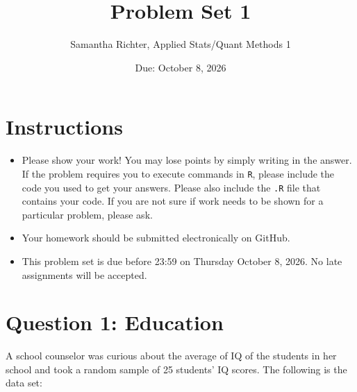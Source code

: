 \documentclass[12pt,letterpaper]{article}
\title{Problem Set 1}
\date{Due: October 8, 2026}
\author{Samantha Richter, Applied Stats/Quant Methods 1}
\begin{document}
	\maketitle
	
	\section*{Instructions}
	\begin{itemize}
	\item Please show your work! You may lose points by simply writing in the answer. If the problem requires you to execute commands in \texttt{R}, please include the code you used to get your answers. Please also include the \texttt{.R} file that contains your code. If you are not sure if work needs to be shown for a particular problem, please ask.
\item Your homework should be submitted electronically on GitHub.
\item This problem set is due before 23:59 on Thursday October 8, 2026. No late assignments will be accepted.
	\end{itemize}
	
	\vspace{1cm}
	\section*{Question 1: Education}

A school counselor was curious about the average of IQ of the students in her school and took a random sample of 25 students' IQ scores. The following is the data set:\\
\vspace{.5cm}

  

\vspace{1cm}
\end{document}
